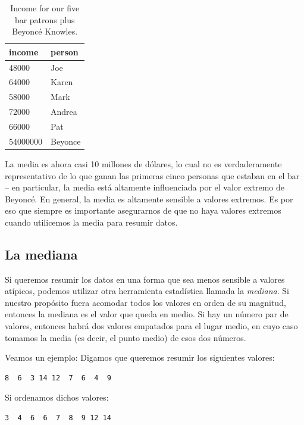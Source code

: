\documentclass[
  12pt,
]{book}
\theoremstyle{definition}
\theoremstyle{definition}
\theoremstyle{definition}
\theoremstyle{remark}
\begin{document}
\begin{table}

\caption{\label{tab:unnamed-chunk-19}Income for our five bar patrons plus Beyoncé Knowles.}
\centering
\begin{tabular}[t]{l|l}
\hline
income & person\\
\hline
48000 & Joe\\
\hline
64000 & Karen\\
\hline
58000 & Mark\\
\hline
72000 & Andrea\\
\hline
66000 & Pat\\
\hline
54000000 & Beyonce\\
\hline
\end{tabular}
\end{table}

La media es ahora casi 10 millones de dólares, lo cual no es verdaderamente representativo de lo que ganan las primeras cinco personas que estaban en el bar -- en particular, la media está altamente influenciada por el valor extremo de Beyoncé. En general, la media es altamente sensible a valores extremos. Es por eso que siempre es importante asegurarnos de que no haya valores extremos cuando utilicemos la media para resumir datos.

\hypertarget{la-mediana}{%
\subsection{La mediana}\label{la-mediana}}

Si queremos resumir los datos en una forma que sea menos sensible a valores atípicos, podemos utilizar otra herramienta estadística llamada la \emph{mediana}. Si nuestro propósito fuera acomodar todos los valores en orden de su magnitud, entonces la mediana es el valor que queda en medio. Si hay un número par de valores, entonces habrá dos valores empatados para el lugar medio, en cuyo caso tomamos la media (es decir, el punto medio) de esos dos números.

Veamos un ejemplo: Digamos que queremos resumir los siguientes valores:

\begin{verbatim}
8  6  3 14 12  7  6  4  9
\end{verbatim}

Si ordenamos dichos valores:

\begin{verbatim}
3  4  6  6  7  8  9 12 14
\end{verbatim}
\end{document}
